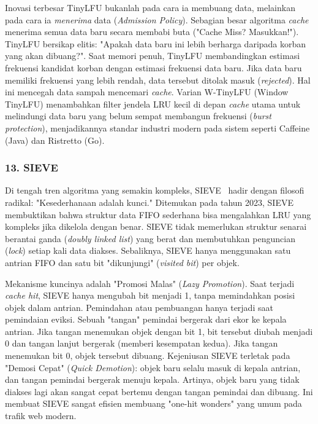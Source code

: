 Inovasi terbesar TinyLFU bukanlah pada cara ia membuang data,
melainkan pada cara ia \textit{menerima} data (\textit{Admission Policy}).
Sebagian besar algoritma \textit{cache} menerima semua data baru
secara membabi buta ("Cache Miss? Masukkan!").
TinyLFU bersikap elitis: "Apakah data baru ini lebih berharga
daripada korban yang akan dibuang?".
Saat memori penuh, TinyLFU membandingkan estimasi frekuensi kandidat
korban dengan estimasi frekuensi data baru.
Jika data baru memiliki frekuensi yang lebih rendah, data tersebut
ditolak masuk (\textit{rejected}).
Hal ini mencegah data sampah mencemari \textit{cache}.
Varian W-TinyLFU (Window TinyLFU) menambahkan filter jendela LRU
kecil di depan \textit{cache} utama untuk melindungi data baru yang
belum sempat membangun frekuensi (\textit{burst protection}),
menjadikannya standar industri modern pada sistem seperti Caffeine
(Java) dan Ristretto (Go).

\subsubsection{13. SIEVE}
Di tengah tren algoritma yang semakin kompleks,
SIEVE~\cite{Zhang2024SIEVE} hadir dengan filosofi radikal:
"Kesederhanaan adalah kunci."
Ditemukan pada tahun 2023, SIEVE membuktikan bahwa struktur data FIFO
sederhana bisa mengalahkan LRU yang kompleks jika dikelola dengan benar.
SIEVE tidak memerlukan struktur senarai berantai ganda
(\textit{doubly linked list}) yang berat dan membutuhkan penguncian
(\textit{lock}) setiap kali data diakses.
Sebaliknya, SIEVE hanya menggunakan satu antrian FIFO dan satu bit
"dikunjungi" (\textit{visited bit}) per objek.

Mekanisme kuncinya adalah "Promosi Malas" (\textit{Lazy Promotion}).
Saat terjadi \textit{cache hit}, SIEVE hanya mengubah bit menjadi 1,
tanpa memindahkan posisi objek dalam antrian.
Pemindahan atau pembuangan hanya terjadi saat pemindaian eviksi.
Sebuah "tangan" pemindai bergerak dari ekor ke kepala antrian.
Jika tangan menemukan objek dengan bit 1, bit tersebut diubah menjadi
0 dan tangan lanjut bergerak (memberi kesempatan kedua).
Jika tangan menemukan bit 0, objek tersebut dibuang.
Kejeniusan SIEVE terletak pada "Demosi Cepat" (\textit{Quick
Demotion}): objek baru selalu masuk di kepala antrian, dan tangan
pemindai bergerak menuju kepala.
Artinya, objek baru yang tidak diakses lagi akan sangat cepat bertemu
dengan tangan pemindai dan dibuang.
Ini membuat SIEVE sangat efisien membuang "one-hit wonders" yang umum
pada trafik web modern.

